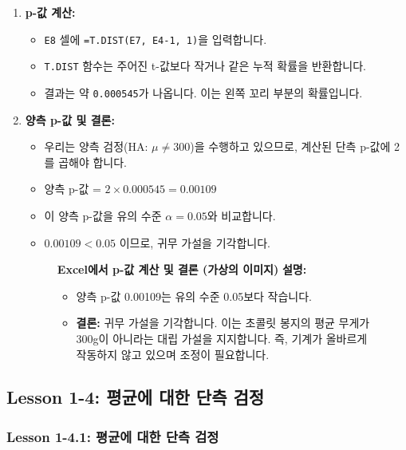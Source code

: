 \documentclass[11pt,a4paper]{book}
\providecommand{\captionof}[2]{\textbf{#2}}
\theoremstyle{definition}
\begin{document}
\begin{enumerate}
    \item \textbf{p-값 계산:}
    \begin{itemize}
        \item \texttt{E8} 셀에 \texttt{=T.DIST(E7, E4-1, 1)}을 입력합니다.
        \item \texttt{T.DIST} 함수는 주어진 t-값보다 작거나 같은 누적 확률을 반환합니다.
        \item 결과는 약 \texttt{0.000545}가 나옵니다. 이는 왼쪽 꼬리 부분의 확률입니다.
    \end{itemize}

    \item \textbf{양측 p-값 및 결론:}
    \begin{itemize}
        \item 우리는 양측 검정(HA: $\mu \ne 300$)을 수행하고 있으므로, 계산된 단측 p-값에 2를 곱해야 합니다.
        \item 양측 p-값 = $2 \times 0.000545 = 0.00109$
        \item 이 양측 p-값을 유의 수준 $\alpha = 0.05$와 비교합니다.
        \item $0.00109 < 0.05$ 이므로, 귀무 가설을 기각합니다.
    \end{itemize}
    \begin{figure}[h!]
        \centering
        \captionof{figure}{Excel에서 p-값 계산 및 결론 (가상의 이미지)}
        \label{fig:excel_p_value_conclusion}
        \vspace{0.5em}
        \textbf{설명:}
        \begin{itemize}
            \item 양측 p-값 0.00109는 유의 수준 0.05보다 작습니다.
            \item \textbf{결론:} 귀무 가설을 기각합니다. 이는 초콜릿 봉지의 평균 무게가 300g이 아니라는 대립 가설을 지지합니다. 즉, 기계가 올바르게 작동하지 않고 있으며 조정이 필요합니다.
        \end{itemize}
    \end{figure}
\end{enumerate}


\subsection{Lesson 1-4: 평균에 대한 단측 검정}

\subsubsection{Lesson 1-4.1: 평균에 대한 단측 검정}
\end{document}
